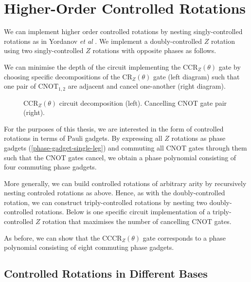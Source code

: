 \section{Higher-Order Controlled Rotations}

We can implement higher order controlled rotations by nesting singly-controlled rotations as in Yordanov \textit{et al} \cite{Yordanov2020}. We implement a doubly-controlled $Z$ rotation using two singly-controlled $Z$ rotations with opposite phases as follows.


We can minimise the depth of the circuit implementing the CCR$_Z(\theta)$ gate by choosing specific decompositions of the CR$_Z(\theta)$ gate (left diagram) such that one pair of $\text{CNOT}_{1, 2}$ are adjacent and cancel one-another (right diagram).

\begin{figure}[H]
    \centering
    \caption{CCR$_Z(\theta)$ circuit decomposition (left). Cancelling CNOT gate pair (right).}
\end{figure}

For the purposes of this thesis, we are interested in the form of controlled rotations in terms of Pauli gadgets. By expressing all $Z$ rotations as phase gadgets (\ref{phase-gadget-single-leg}) and commuting all CNOT gates through them such that the CNOT gates cancel, we obtain a phase polynomial consisting of four commuting phase gadgets.


More generally, we can build controlled rotations of arbitrary arity by recursively nesting controled rotations as above. Hence, as with the doubly-controlled rotation, we can construct triply-controlled rotations by nesting two doubly-controlled rotations. Below is one specific circuit implementation of a triply-controlled $Z$ rotation that maximises the number of cancelling CNOT gates.


As before, we can show that the CCCR$_Z(\theta)$ gate corresponds to a phase polynomial consisting of eight commuting phase gadgets.


\subsection{Controlled Rotations in Different Bases}

